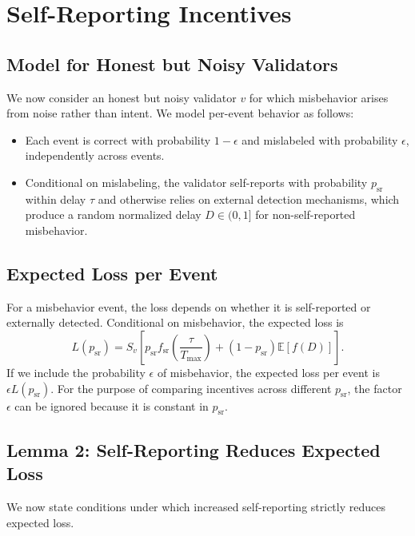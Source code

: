 \documentclass[11pt]{article}
\theoremstyle{plain}
\theoremstyle{definition}
\begin{document}
\section{Self-Reporting Incentives}

\subsection{Model for Honest but Noisy Validators}

We now consider an honest but noisy validator \(v\) for which misbehavior arises from noise rather than intent. We model per-event behavior as follows:
\begin{itemize}[leftmargin=*]
  \item Each event is correct with probability \(1-\epsilon\) and mislabeled with probability \(\epsilon\), independently across events.
  \item Conditional on mislabeling, the validator self-reports with probability \(p_{\mathrm{sr}}\) within delay \(\tau\) and otherwise relies on external detection mechanisms, which produce a random normalized delay \(D \in (0,1]\) for non-self-reported misbehavior.
\end{itemize}

\subsection{Expected Loss per Event}

For a misbehavior event, the loss depends on whether it is self-reported or externally detected. Conditional on misbehavior, the expected loss is
\[
L(p_{\mathrm{sr}}) = S_v\left[p_{\mathrm{sr}} f_{\mathrm{sr}}\!\left(\frac{\tau}{T_{\max}}\right) + (1-p_{\mathrm{sr}})\mathbb{E}[f(D)]\right].
\]
If we include the probability \(\epsilon\) of misbehavior, the expected loss per event is \(\epsilon L(p_{\mathrm{sr}})\). For the purpose of comparing incentives across different \(p_{\mathrm{sr}}\), the factor \(\epsilon\) can be ignored because it is constant in \(p_{\mathrm{sr}}\).

\subsection{Lemma 2: Self-Reporting Reduces Expected Loss}

We now state conditions under which increased self-reporting strictly reduces expected loss.
\end{document}
